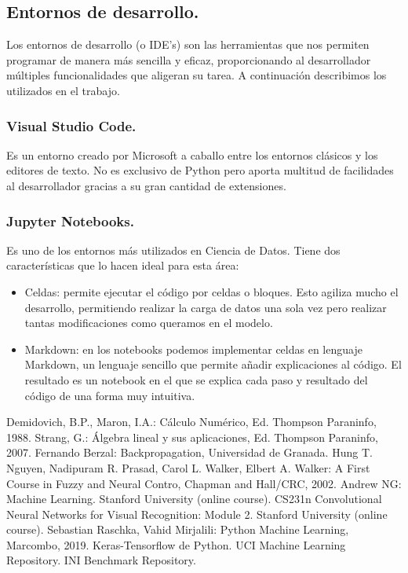 \documentclass[a4paper,11pt]{article}
\begin{document}
\subsection{Entornos de desarrollo.}
Los entornos de desarrollo (o IDE's) son las herramientas que nos permiten programar de manera más sencilla y eficaz, proporcionando al desarrollador múltiples funcionalidades que aligeran su tarea. A continuación describimos los utilizados en el trabajo.
\subsubsection{Visual Studio Code.}
Es un entorno creado por Microsoft a caballo entre los entornos clásicos y los editores de texto. No es exclusivo de Python pero aporta multitud de facilidades al desarrollador gracias a su gran cantidad de extensiones.
\subsubsection{Jupyter Notebooks.}
Es uno de los entornos más utilizados en Ciencia de Datos. Tiene dos características que lo hacen ideal para esta área:
\begin{itemize}
\item  Celdas: permite ejecutar el código por celdas o bloques. Esto agiliza mucho el desarrollo, permitiendo realizar la carga de datos una sola vez pero realizar tantas modificaciones como queramos en el modelo.
\item Markdown: en los notebooks podemos implementar celdas en lenguaje Markdown, un lenguaje sencillo que permite añadir explicaciones al código. El resultado es un notebook en el que se explica cada paso y resultado del código de una forma muy intuitiva.
\end{itemize}

\newpage


\begin{thebibliography}{99}

 Demidovich, B.P., Maron, I.A.: Cálculo Numérico,  Ed. Thompson Paraninfo, 1988.
 Strang, G.: Álgebra lineal y sus aplicaciones, Ed. Thompson Paraninfo, 2007.
 Fernando Berzal: Backpropagation, Universidad de Granada.
 Hung T. Nguyen, Nadipuram R. Prasad, Carol L. Walker, Elbert A. Walker: A First Course in Fuzzy and Neural Contro, Chapman and Hall/CRC, 2002.
 Andrew NG: Machine Learning. Stanford University (online course).
 CS231n Convolutional Neural Networks for Visual Recognition: Module 2. Stanford University (online course).
 Sebastian Raschka, Vahid Mirjalili: Python Machine Learning, Marcombo, 2019.
 Keras-Tensorflow de Python.
 UCI Machine Learning Repository.
 INI Benchmark Repository.
\end{thebibliography}
\newpage
\end{document}
